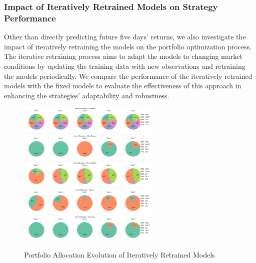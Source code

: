 \subsubsection{Impact of Iteratively Retrained Models on Strategy Performance}
Other than directly predicting future five days' returns, we also investigate the impact of iteratively retraining the models on the portfolio optimization process. The iterative retraining process aims to adapt the models to changing market conditions by updating the training data with new observations and retraining the models periodically.
 We compare the performance of the iteratively retrained models with the fixed models to evaluate the effectiveness of this approach in enhancing the strategies' adaptability and robustness.
\begin{figure}[htbp]
    \centering
    \includegraphics[width=0.6\textwidth]{figures/iterative/asset_allocations_constant.png}
    \includegraphics[width=0.6\textwidth]{figures/iterative/asset_allocations_max_return.png}
    \includegraphics[width=0.6\textwidth]{figures/iterative/asset_allocations_min_volatility.png}
    \includegraphics[width=0.6\textwidth]{figures/iterative/asset_allocations_sharpe.png}
    \includegraphics[width=0.6\textwidth]{figures/iterative/asset_allocations_dynamic.png}
    \caption{Portfolio Allocation Evolution of Iteratively Retrained Models}
    \label{fig:asset_allocations_evolution_iterative}
\end{figure}
